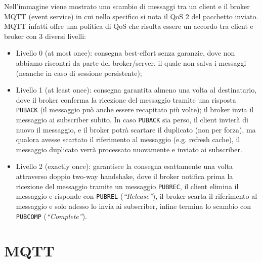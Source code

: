 Nell'immagine viene mostrato uno scambio di messaggi tra un client e il broker MQTT (event service) in cui nello specifico si nota il QoS 2 del pacchetto inviato. MQTT infatti offre una politica di QoS che risulta essere un accordo tra client e broker con 3 diversi livelli:

\begin{itemize}
\item Livello 0 (at most once): consegna best-effort senza garanzie, dove non abbiamo riscontri da parte del broker/server, il quale non salva i messaggi (neanche in caso di sessione persistente);
\item Livello 1 (at least once): consegna garantita almeno una volta al destinatario, dove il broker conferma la ricezione del messaggio tramite una risposta \texttt{PUBACK} (il messaggio può anche essere recapitato più volte);
il broker invia il messaggio ai subscriber subito. In caso \texttt{PUBACK} sia perso, il client invierà di nuovo il messaggio, e il broker potrà scartare il duplicato (non per forza), ma qualora avesse scartato il riferimento al messaggio (e.g. refresh cache), il messaggio duplicato verrà processato nuovamente e inviato ai subscriber.

\item Livello 2 (exactly once): garantisce la consegna esattamente una volta attraverso doppio two-way handshake, dove il broker notifica prima la ricezione del messaggio tramite un messaggio \texttt{PUBREC}, il client elimina il messaggio e risponde con \texttt{PUBREL} (\textit{``Release''}), il broker scarta il riferimento al messaggio e solo adesso lo invia ai subscriber, infine termina lo scambio con \texttt{PUBCOMP} (\textit{``Complete''}).
\end{itemize}

\section{MQTT}

